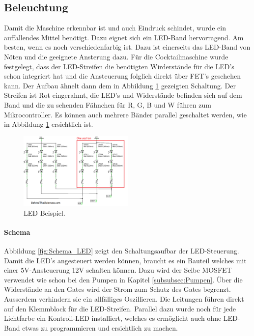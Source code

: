\subsection{Beleuchtung}
\label{subsec:Beleuchtung_2}

Damit die Maschine erkennbar ist und auch Eindruck schindet, wurde ein auffallendes Mittel benötigt. Dazu eignet sich ein LED-Band hervorragend. Am besten, wenn es noch verschiedenfarbig ist. Dazu ist einerseits das LED-Band von Nöten und die geeignete Ansterung dazu. Für die Cocktailmaschine wurde festgelegt, dass der LED-Streifen die benötigten Wirderstände für die LED's schon integriert hat und die Ansteuerung folglich direkt über FET's geschehen kann. Der Aufbau ähnelt dann dem in Abbildung \ref{fig:LED1} gezeigten Schaltung. Der Streifen ist Rot eingerahmt, die LED's und Widerstände befinden sich auf dem Band und die zu sehenden Fähnchen für R, G, B und W führen zum Mikrocontroller. Es können auch mehrere Bänder parallel geschaltet werden, wie in Abbildung \ref{fig:LED1} ersichtlich ist.

\begin{figure}[h!]
\center
\includegraphics[width = 0.5\textwidth]{graphics/Schema_LED1}
\caption{LED Beispiel. \cite{behindthesciences_rgb_2017}}
\label{fig:LED1}
\end{figure}

\paragraph{Schema}\mbox{}

Abbildung \ref{fig:Schema_LED} zeigt den Schaltungsaufbar der LED-Steuerung. Damit die LED's angesteuert werden können, braucht es ein Bauteil welches mit einer 5V-Ansteuerung 12V schalten können. Dazu wird der Selbe MOSFET verwendet wie schon bei den Pumpen in Kapitel \ref{subsubsec:Pumpen}. Über die Widerstände an den Gates wird der Strom zum Schutz des Gates begrenzt. Ausserdem verhindern sie ein allfälliges Oszillieren. Die Leitungen führen direkt auf den Klemmblock für die LED-Streifen. Parallel dazu wurde noch für jede Lichtfarbe ein Kontroll-LED installiert, welches es ermöglicht auch ohne LED-Band etwas zu programmieren und ersichtlich zu machen.

